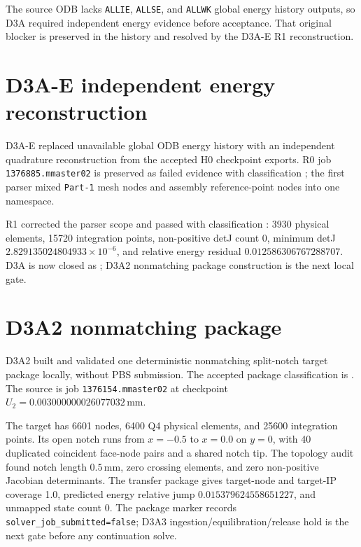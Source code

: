 The source ODB lacks \texttt{ALLIE}, \texttt{ALLSE}, and \texttt{ALLWK} global
energy history outputs, so D3A required independent energy evidence before
acceptance. That original blocker is preserved in the history and resolved by
the D3A-E R1 reconstruction.

\section{D3A-E independent energy reconstruction}
D3A-E replaced unavailable global ODB energy history with an independent
quadrature reconstruction from the accepted H0 checkpoint exports. R0 job
\texttt{1376885.mmaster02} is preserved as failed evidence with classification
; the first parser
mixed \texttt{Part-1} mesh nodes and assembly reference-point nodes into one
namespace.

R1 corrected the parser scope and passed with classification
: 3930 physical elements, 15720
integration points, non-positive detJ count 0, minimum detJ
$2.829135024804933\times10^{-6}$, and relative energy residual
$0.012586306767288707$. D3A is now closed as
; D3A2
nonmatching package construction is the next local gate.

\section{D3A2 nonmatching package}
D3A2 built and validated one deterministic nonmatching split-notch target
package locally, without PBS submission. The accepted package classification is
. The source is job
\texttt{1376154.mmaster02} at checkpoint
$U_2=0.003000000026077032\,\mathrm{mm}$.

The target has 6601 nodes, 6400 Q4 physical elements, and 25600 integration
points. Its open notch runs from $x=-0.5$ to $x=0.0$ on $y=0$, with 40
duplicated coincident face-node pairs and a shared notch tip. The topology audit
found notch length $0.5\,\mathrm{mm}$, zero crossing elements, and zero
non-positive Jacobian determinants. The transfer package gives target-node and
target-IP coverage 1.0, predicted energy relative jump
$0.015379624558651227$, and unmapped state count 0. The package marker records
\texttt{solver\_job\_submitted=false}; D3A3 ingestion/equilibration/release hold
is the next gate before any continuation solve.

